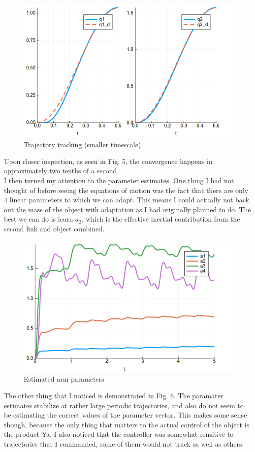 \documentclass[12pt]{article}
\begin{document}
\begin{figure}[H]
    \centering
    \includegraphics[width=3.5in\textsize]{arm_trajectory_tracking.png}
    \caption{Trajectory tracking (smaller timescale)}
    \label{fig:arm2}
\end{figure}

\noindent
Upon closer inspection, as seen in Fig. 5, the convergence happens in approximately two tenths of a second.
\\

\noindent
I then turned my attention to the parameter estimates. One thing I had not thought of before seeing the equations of motion was the fact that there are only 4 linear parameters to which we can adapt. This means I could actually not back out the mass of the object with adaptation as I had originally planned to do. The best we can do is learn $a_2$, which is the effective inertial contribution from the second link and object combined.

\begin{figure}[H]
    \centering
    \includegraphics[width=3.5in\textsize]{arm_parameter_estimates.png}
    \caption{Estimated arm parameters}
    \label{fig:arm_param}
\end{figure}

\noindent
The other thing that I noticed is demonstrated in Fig. 6. The paramater estimates stabilize at rather large periodic trajectories, and also do not seem to be estimating the correct values of the parameter vector. This makes some sense though, because the only thing that matters to the actual control of the object is the product Ya. I also noticed that the controller was somewhat sensitive to trajectories that I commanded, some of them would not track as well as others.
\\
\end{document}
